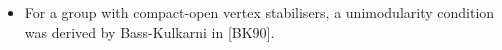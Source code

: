 \documentclass[preview]{standalone}
\begin{document}
\begin{center}
\begin{itemize} \item For a group with compact-open vertex stabilisers, a unimodularity condition was derived by Bass-Kulkarni in [BK90]\vspace{-11pt}.\end{itemize}
\end{center}
\end{document}
